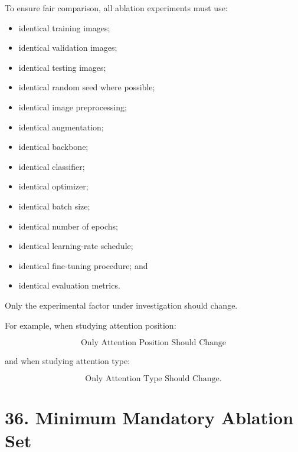 \documentclass[10pt]{article}
\begin{document}
To ensure fair comparison, all ablation experiments must use:

\begin{itemize}

\item identical training images;

\item identical validation images;

\item identical testing images;

\item identical random seed where possible;

\item identical image preprocessing;

\item identical augmentation;

\item identical backbone;

\item identical classifier;

\item identical optimizer;

\item identical batch size;

\item identical number of epochs;

\item identical learning-rate schedule;

\item identical fine-tuning procedure; and

\item identical evaluation metrics.

\end{itemize}

Only the experimental factor under investigation should change.

For example, when studying attention position:

\[
\boxed{
\text{Only Attention Position Should Change}
}
\]

and when studying attention type:

\[
\boxed{
\text{Only Attention Type Should Change}.
}
\]

\section*{36. Minimum Mandatory Ablation Set}
\end{document}
